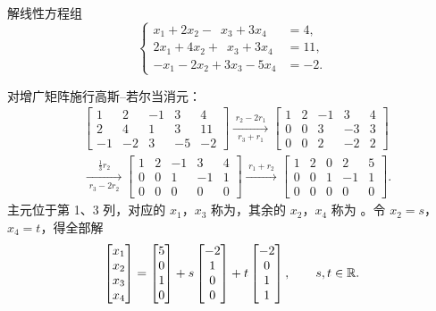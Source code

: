 \begin{example}\label{ex:free-variables}
解线性方程组
\[
\left\{
\begin{aligned}
   x_1+2x_2-\phantom{3}x_3+3x_4&=4,\\
  2x_1+4x_2+\phantom{3}x_3+3x_4&=11,\\
  -x_1-2x_2+3x_3-5x_4&=-2.
\end{aligned}
\right.
\]
\end{example}

\begin{solution}
对增广矩阵施行高斯--若尔当消元：
\begin{align*}
&\left[\begin{array}{rrrr|r}
 1 &  2 & -1 &  3 &  4\\
 2 &  4 &  1 &  3 & 11\\
-1 & -2 &  3 & -5 & -2
\end{array}\right]
\xrightarrow[\;r_3+r_1\;]{\;r_2-2r_1\;}
\left[\begin{array}{rrrr|r}
 1 & 2 & -1 &  3 & 4\\
 0 & 0 &  3 & -3 & 3\\
 0 & 0 &  2 & -2 & 2
\end{array}\right]\\
&\xrightarrow[\;r_3-2r_2\;]{\;\frac13r_2\;}
\left[\begin{array}{rrrr|r}
 1 & 2 & -1 &  3 & 4\\
 0 & 0 &  1 & -1 & 1\\
 0 & 0 &  0 &  0 & 0
\end{array}\right]
\xrightarrow{\;r_1+r_2\;}
\left[\begin{array}{rrrr|r}
 1 & 2 & 0 &  2 & 5\\
 0 & 0 & 1 & -1 & 1\\
 0 & 0 & 0 &  0 & 0
\end{array}\right].
\end{align*}
主元位于第 1、3 列，对应的 $x_1$，$x_3$ 称为，其余的 $x_2$，$x_4$ 称为
。令 $x_2=s$，$x_4=t$，得全部解
\[
\begin{bmatrix}x_1\\x_2\\x_3\\x_4\end{bmatrix}
=\begin{bmatrix}5\\0\\1\\0\end{bmatrix}
+s\begin{bmatrix}-2\\1\\0\\0\end{bmatrix}
+t\begin{bmatrix}-2\\0\\1\\1\end{bmatrix},
\qquad s,t\in\mathbb{R} .
\]
\end{solution}


